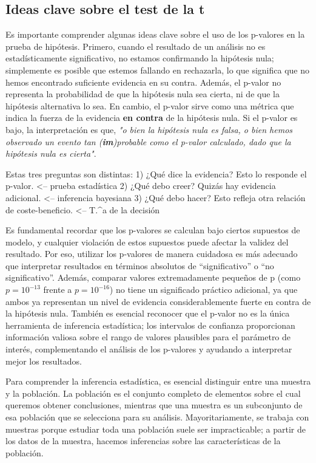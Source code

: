 \documentclass{config/apuntes}\usepackage[]{graphicx}\usepackage[]{xcolor}
\begin{document}
\subsection{Ideas clave sobre el test de la t}
Es importante comprender algunas ideas clave sobre el uso de los p-valores en la prueba de hipótesis. Primero, cuando el resultado de un análisis no es estadísticamente significativo, no estamos confirmando la hipótesis nula; simplemente es posible que estemos fallando en rechazarla, lo que significa que no hemos encontrado suficiente evidencia en su contra. Además, el p-valor no representa la probabilidad de que la hipótesis nula sea cierta, ni de que la hipótesis alternativa lo sea. En cambio, el p-valor sirve como una métrica que indica la fuerza de la evidencia \textbf{en contra} de la hipótesis nula. Si el p-valor es bajo, la interpretación es que, \textit{"o bien la hipótesis nula es falsa, o bien hemos observado un evento tan (\textbf{im})probable como el p-valor calculado, dado que la hipótesis nula es cierta"}.

Estas tres preguntas son distintas: 
1) ¿Qué dice la evidencia? Esto lo responde el p-valor. <-- prueba estadística
2) ¿Qué debo creer? Quizás hay evidencia adicional. <-- inferencia bayesiana
3) ¿Qué debo hacer? Esto refleja otra relación de coste-beneficio. <-- T.^{a} de la decisión

Es fundamental recordar que los p-valores se calculan bajo ciertos supuestos de modelo, y cualquier violación de estos supuestos puede afectar la validez del resultado. Por eso, utilizar los p-valores de manera cuidadosa es más adecuado que interpretar resultados en términos absolutos de “significativo” o “no significativo”. Además, comparar valores extremadamente pequeños de p (como $p = 10^{-13}$ frente a $p = 10^{-16}$) no tiene un significado práctico adicional, ya que ambos ya representan un nivel de evidencia considerablemente fuerte en contra de la hipótesis nula. También es esencial reconocer que el p-valor no es la única herramienta de inferencia estadística; los intervalos de confianza proporcionan información valiosa sobre el rango de valores plausibles para el parámetro de interés, complementando el análisis de los p-valores y ayudando a interpretar mejor los resultados.

Para comprender la inferencia estadística, es esencial distinguir entre una muestra y la población. La población es el conjunto completo de elementos sobre el cual queremos obtener conclusiones, mientras que una muestra es un subconjunto de esa población que se selecciona para su análisis. Mayoritariamente, se trabaja con muestras porque estudiar toda una población suele ser impracticable; a partir de los datos de la muestra, hacemos inferencias sobre las características de la población.
\end{document}

